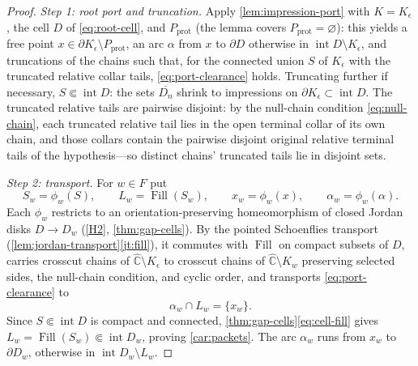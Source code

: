 \documentclass[11pt,reqno]{amsart}
\numberwithin{equation}{section}
\theoremstyle{plain}
\theoremstyle{definition}
\theoremstyle{remark}
\DeclareMathOperator{\Fill}{Fill}
\newcommand{\Chat}{\widehat{\mathbb C}}
\newcommand{\rootK}{K_{\epsilon}}
\begin{document}
\begin{proof}
\emph{Step 1: root port and truncation.}
Apply \cref{lem:impression-port} with $K=\rootK$, the cell $D$ of
\eqref{eq:root-cell}, and $P_{\mathrm{prot}}$ (the lemma covers
$P_{\mathrm{prot}}=\varnothing$): this yields a free point
$x\in\partial\rootK\setminus P_{\mathrm{prot}}$, an arc $\alpha$ from
$x$ to $\partial D$ otherwise in
$\operatorname{int}D\setminus\rootK$, and truncations of the chains
such that, for the connected union $S$ of $\rootK$ with the truncated
relative collar tails, \eqref{eq:port-clearance} holds.  Truncating
further if necessary, $S\Subset\operatorname{int}D$: the sets
$\overline{D_n}$ shrink to impressions on
$\partial\rootK\subset\operatorname{int}D$.  The truncated relative
tails are pairwise disjoint: by the null-chain condition
\eqref{eq:null-chain}, each truncated relative tail lies in the open
terminal collar of its own chain, and those collars contain the
pairwise disjoint original relative terminal tails of the
hypothesis---so distinct chains' truncated tails lie in disjoint sets.

\emph{Step 2: transport.}
For $w\in F$ put
\[
 S_w=\phi_w(S),\qquad
 L_w=\Fill(S_w),\qquad
 x_w=\phi_w(x),\qquad
 \alpha_w=\phi_w(\alpha).
\]
Each $\phi_w$ restricts to an orientation-preserving homeomorphism of
closed Jordan disks $D\to D_w$ (\ref{H2}, \cref{thm:gap-cells}).  By
the pointed Schoenflies transport
(\cref{lem:jordan-transport}\ref{jt:fill}), it commutes with $\Fill$
on compact subsets of $D$, carries crosscut chains of
$\Chat\setminus\rootK$ to crosscut chains of $\Chat\setminus K_w$
preserving selected sides, the null-chain condition, and cyclic order,
and transports \eqref{eq:port-clearance} to
\begin{equation}
 \alpha_w\cap L_w=\{x_w\}.
\label{eq:transported-port}
\end{equation}
Since $S\Subset\operatorname{int}D$ is compact and connected,
\cref{thm:gap-cells}\eqref{eq:cell-fill} gives
$L_w=\Fill(S_w)\Subset\operatorname{int}D_w$, proving
\ref{car:packets}.  The arc $\alpha_w$ runs from $x_w$ to
$\partial D_w$, otherwise in $\operatorname{int}D_w\setminus L_w$.


\end{proof}
\end{document}
